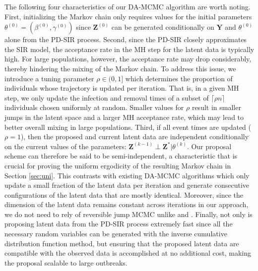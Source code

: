 \documentclass[12pt]{article}
\begin{document}
The following four characteristics of our DA-MCMC algorithm are worth noting.
First, initializing the Markov chain only requires values for the initial parameters $\theta^{(0)} = (\beta^{(0)}, \gamma^{(0)})$ since $\mathbf{Z}^{(0)}$ can be generated conditionally on $\mathbf{Y}$ and $\theta^{(0)}$ alone from the PD-SIR process.
Second, since the PD-SIR closely approximates the SIR model, the acceptance rate in the MH step for the latent data is typically high. For large populations, however, the acceptance rate may drop considerably, thereby hindering the mixing of the Markov chain. To address this issue, we introduce a tuning parameter $\rho \in (0, 1]$ which determines the proportion of individuals whose trajectory is updated per iteration. That is, in a given MH step, we only update the infection and removal times of a subset of $\lceil\rho n\rceil$ individuals chosen uniformly at random.
Smaller values for $\rho$ result in smaller jumps in the latent space and a larger MH acceptance rate, which may lead to better overall mixing in large populations.
Third, if all event times are updated ($\rho = 1$), then the proposed and current latent data are independent conditionally on the current values of the parameters: $\mathbf{Z}^{(k-1)} \perp \mathbf{Z}^* | \theta^{(k)}$. Our proposal scheme can therefore be said to be semi-independent, a characteristic that is crucial for proving the uniform ergodicity of the resulting Markov chain in Section \ref{sec:uni}. This contrasts with existing DA-MCMC algorithms which only update a small fraction of the latent data per iteration and generate consecutive configurations of the latent data that are mostly identical. 
Moreover, since the dimension of the latent data remains constant across iterations in our approach, we do not need to rely of reversible jump MCMC unlike \cite{Gibson.1998} and \cite{ONeill.1999}.
Finally, not only is proposing latent data from the PD-SIR process extremely fast since all the necessary random variables can be generated with the inverse cumulative distribution function method, but ensuring that the proposed latent data are compatible with the observed data is accomplished at no additional cost, making the proposal scalable to large outbreaks.
\end{document}
